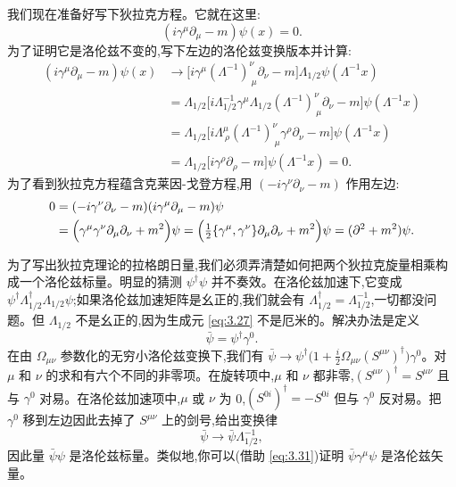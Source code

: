 我们现在准备好写下狄拉克方程。它就在这里:
\begin{equation}
  (i\gamma^\mu\partial_\mu - m)\psi(x) = 0 .
  \label{eq:3.33}
\end{equation}
为了证明它是洛伦兹不变的,写下左边的洛伦兹变换版本并计算:
\begin{align}
  (i\gamma^\mu\partial_\mu - m)\psi(x)
  &\to \bigl[ i\gamma^\mu(\Lambda^{-1})^{\nu}_{\ \mu}\partial_\nu - m \bigr]
    \Lambda_{1/2}\psi(\Lambda^{-1}x)\\
  &= \Lambda_{1/2}\bigl[ i\Lambda_{1/2}^{-1}\gamma^\mu\Lambda_{1/2}
    (\Lambda^{-1})^{\nu}_{\ \mu}\partial_\nu - m \bigr]\psi(\Lambda^{-1}x)\\
  &= \Lambda_{1/2}\bigl[ i\Lambda^{\mu}_{\ \rho}
    (\Lambda^{-1})^{\nu}_{\ \mu}\gamma^\rho\partial_\nu - m \bigr]
    \psi(\Lambda^{-1}x)\\
  &= \Lambda_{1/2}\bigl[ i\gamma^\rho\partial_\rho - m \bigr]
    \psi(\Lambda^{-1}x) = 0 .
\end{align}
为了看到狄拉克方程蕴含克莱因-戈登方程,用 $(-i\gamma^\nu\partial_\nu - m)$ 作用左边:
\begin{align}
  0 &= (-i\gamma^\nu\partial_\nu - m)(i\gamma^\mu\partial_\mu - m)\psi\\
  &= \Bigl( \gamma^\mu\gamma^\nu\partial_\mu\partial_\nu + m^2 \Bigr)\psi
    = \Bigl( \tfrac{1}{2}\{\gamma^\mu,\gamma^\nu\}\partial_\mu\partial_\nu
      + m^2 \Bigr)\psi
  = (\partial^2 + m^2)\psi .
\end{align}

为了写出狄拉克理论的拉格朗日量,我们必须弄清楚如何把两个狄拉克旋量相乘构成一个洛伦兹标量。明显的猜测 $\psi^\dagger\psi$ 并不奏效。在洛伦兹加速下,它变成 $\psi^\dagger\Lambda_{1/2}^\dagger\Lambda_{1/2}\psi$;如果洛伦兹加速矩阵是幺正的,我们就会有 $\Lambda_{1/2}^\dagger = \Lambda_{1/2}^{-1}$,一切都没问题。但 $\Lambda_{1/2}$ 不是幺正的,因为生成元 \eqref{eq:3.27} 不是厄米的。解决办法是定义
\begin{equation}
  \bar{\psi} = \psi^\dagger\gamma^0 .
  \label{eq:3.34}
\end{equation}
在由 $\Omega_{\mu\nu}$ 参数化的无穷小洛伦兹变换下,我们有
$\bar{\psi} \to \psi^\dagger\bigl( 1 + \frac{i}{2}\Omega_{\mu\nu}
(S^{\mu\nu})^\dagger \bigr)\gamma^0$。对 $\mu$ 和 $\nu$ 的求和有六个不同的非零项。在旋转项中,$\mu$ 和 $\nu$ 都非零,$(S^{\mu\nu})^\dagger = S^{\mu\nu}$ 且与 $\gamma^0$ 对易。在洛伦兹加速项中,$\mu$ 或 $\nu$ 为 0,$(S^{0i})^\dagger = -S^{0i}$ 但与 $\gamma^0$ 反对易。把 $\gamma^0$ 移到左边因此去掉了 $S^{\mu\nu}$ 上的剑号,给出变换律
\begin{equation}
  \bar{\psi} \to \bar{\psi}\Lambda_{1/2}^{-1},
  \label{eq:3.35}
\end{equation}
因此量 $\bar{\psi}\psi$ 是洛伦兹标量。类似地,你可以(借助 \eqref{eq:3.31})证明 $\bar{\psi}\gamma^\mu\psi$ 是洛伦兹矢量。

